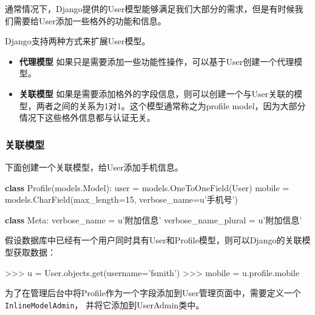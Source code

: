 \documentclass[]{article}
\date{}
\newenvironment{Shaded}{}{}
\newcommand{\KeywordTok}[1]{\textcolor[rgb]{0.00,0.44,0.13}{\textbf{#1}}}
\newcommand{\DecValTok}[1]{\textcolor[rgb]{0.25,0.63,0.44}{#1}}
\newcommand{\StringTok}[1]{\textcolor[rgb]{0.25,0.44,0.63}{#1}}
\newcommand{\OperatorTok}[1]{\textcolor[rgb]{0.40,0.40,0.40}{#1}}
\newcommand{\NormalTok}[1]{#1}
\begin{document}
通常情况下，Django提供的User模型能够满足我们大部分的需求，但是有时候我们需要给User添加一些格外的功能和信息。

Django支持两种方式来扩展User模型。

\begin{itemize}
\item
  \textbf{代理模型}
  如果只是需要添加一些功能性操作，可以基于User创建一个代理模型。
\item
  \textbf{关联模型}
  如果是需要添加格外的字段信息，则可以创建一个与User关联的模型，两者之间的关系为1对1。这个模型通常称之为profile
  model，因为大部分情况下这些格外信息都与认证无关。
\end{itemize}

\subsubsection{关联模型}\label{header-n15}

下面创建一个关联模型，给User添加手机信息。

\begin{Shaded}
\begin{Highlighting}[]
\KeywordTok{class}\NormalTok{ Profile(models.Model):}
\NormalTok{    user }\OperatorTok{=}\NormalTok{ models.OneToOneField(User)}
\NormalTok{    mobile }\OperatorTok{=}\NormalTok{ models.CharField(max_length}\OperatorTok{=}\DecValTok{15}\NormalTok{, verbose_name}\OperatorTok{=}\StringTok{u'手机号'}\NormalTok{)}

    \KeywordTok{class}\NormalTok{ Meta:}
\NormalTok{        verbose_name }\OperatorTok{=} \StringTok{u'附加信息'}
\NormalTok{        verbose_name_plural }\OperatorTok{=} \StringTok{u'附加信息'}
\end{Highlighting}
\end{Shaded}

假设数据库中已经有一个用户同时具有User和Profile模型，则可以Django的关联模型获取数据：

\begin{Shaded}
\begin{Highlighting}[]
\OperatorTok{>>>}\NormalTok{ u }\OperatorTok{=}\NormalTok{ User.objects.get(username}\OperatorTok{=}\StringTok{'fsmith'}\NormalTok{)}
\OperatorTok{>>>}\NormalTok{ mobile }\OperatorTok{=}\NormalTok{ u.profile.mobile }
\end{Highlighting}
\end{Shaded}

为了在管理后台中将Profile作为一个字段添加到User管理页面中，需要定义一个
\texttt{InlineModelAdmin}， 并将它添加到UserAdmin类中。
\end{document}
